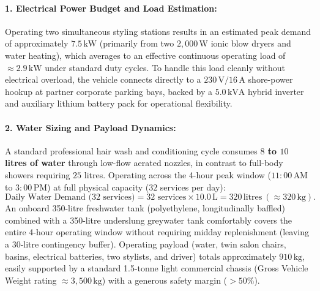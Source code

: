\paragraph{1. Electrical Power Budget and Load Estimation:}
Operating two simultaneous styling stations results in an estimated peak demand of approximately $7.5\,\text{kW}$ (primarily from two $2,000\,\text{W}$ ionic blow dryers and water heating), which averages to an effective continuous operating load of $\approx 2.9\,\text{kW}$ under standard duty cycles. To handle this load cleanly without electrical overload, the vehicle connects directly to a $230\,\text{V}/16\,\text{A}$ shore-power hookup at partner corporate parking bays, backed by a $5.0\,\text{kVA}$ hybrid inverter and auxiliary lithium battery pack for operational flexibility.

\paragraph{2. Water Sizing and Payload Dynamics:}
A standard professional hair wash and conditioning cycle consumes \textbf{$8$ to $10$ litres of water} through low-flow aerated nozzles, in contrast to full-body showers requiring $25$ litres. Operating across the 4-hour peak window ($11{:}00\,\text{AM}$ to $3{:}00\,\text{PM}$) at full physical capacity ($32$ services per day):
\begin{equation}
    \text{Daily Water Demand (32 services)} = 32\text{ services} \times 10.0\,\text{L} = 320\,\text{litres} \ (\approx 320\,\text{kg}).
\end{equation}
An onboard 350-litre freshwater tank (polyethylene, longitudinally baffled) combined with a 350-litre underslung greywater tank comfortably covers the entire 4-hour operating window without requiring midday replenishment (leaving a 30-litre contingency buffer). Operating payload (water, twin salon chairs, basins, electrical batteries, two stylists, and driver) totals approximately \textbf{$910\,\text{kg}$}, easily supported by a standard 1.5-tonne light commercial chassis (Gross Vehicle Weight rating $\approx 3,500\,\text{kg}$) with a generous safety margin ($> 50\%$).


